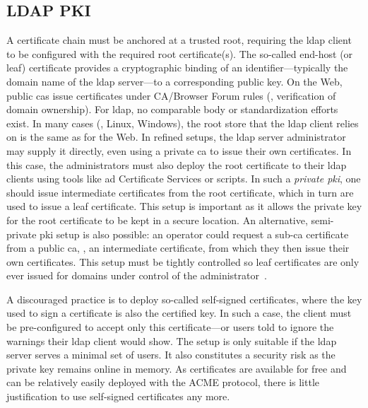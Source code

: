 \subsection{LDAP PKI}
\label{subsec:background-ldap-pki}
A certificate chain must be anchored at a trusted root, requiring the \gls{ldap} client to be configured with the required root certificate(s).
The so-called end-host (or leaf) certificate provides a cryptographic binding of an identifier---typically the domain name of the \gls{ldap} server---to a corresponding public key.
On the Web, public \glspl{ca} issue certificates under CA/Browser Forum rules (\eg, verification of domain ownership).
For \gls{ldap}, no comparable body or standardization efforts exist.
In many cases (\eg, Linux, Windows), the root store that the \gls{ldap} client relies on is the same as for the Web.
In refined setups, the \gls{ldap} server administrator may supply it directly, even using a private \gls{ca} to issue their own certificates.
In this case, the administrators must also deploy the root certificate to their \gls{ldap} clients using tools like \gls{ad} Certificate Services or scripts.
In such a \textit{private \gls{pki}}, one should issue intermediate certificates from the root certificate, which in turn are used to issue a leaf certificate.
This setup is important as it allows the private key for the root certificate to be kept in a secure location. An alternative, semi-private \gls{pki} setup is also possible: an operator could request a sub-\gls{ca} certificate from a public \gls{ca}, \ie, an intermediate certificate, from which they then issue their own certificates.
This setup must be tightly controlled so leaf certificates are only ever issued for domains under control of the administrator~\cite{cabr}.

A discouraged practice is to deploy so-called self-signed certificates, where the key used to sign a certificate is also the certified key.
In such a case, the client must be pre-configured to accept only this certificate---or users told to ignore the warnings their \gls{ldap} client would show.
The setup is only suitable if the \gls{ldap} server serves a minimal set of users.
It also constitutes a security risk as the private key remains online in memory.
As certificates are available for free and can be relatively easily deployed with the ACME protocol, there is little justification to use self-signed certificates any more.

